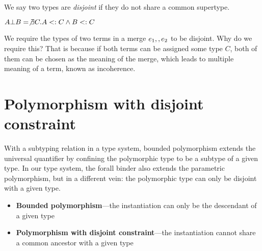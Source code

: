 \documentclass[preprint]{sigplanconf}
\begin{document}
We say two types are \emph{disjoint} if they do not share a common supertype.

\begin{definition}[Disjointness]
$A \bot B = \not \exists C. A <: C \wedge B <: C$
\end{definition}

We require the types of two terms in a merge $e_1 ,, e_2$ to be disjoint. Why do we require this? That is because if both terms can be assigned some type $C$, both of them can be chosen as the meaning of the merge, which leads to multiple meaning of a term, known as incoherence.

%
%

\section{Polymorphism with disjoint constraint}

With a subtyping relation in a type system, bounded polymorphism extends the universal quantifier by confining the polymorphic type to be a subtype of a given type. In our type system, the forall binder also extends the parametric polymorphism, but in a different vein: the polymorphic type can only be disjoint with a given type.

\begin{itemize}
  \item \textbf{Bounded polymorphism}---the instantiation can only be the descendant of a given type
  \item \textbf{Polymorphism with disjoint constraint}---the instantiation cannot share a common ancestor with a given type
\end{itemize}
\end{document}
